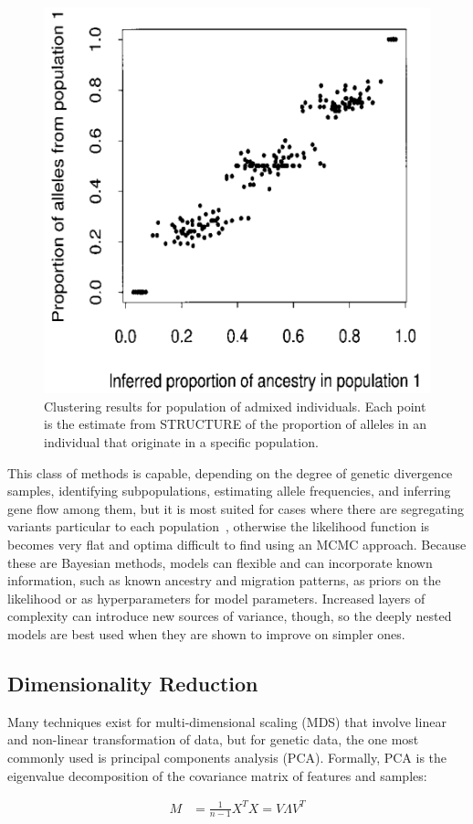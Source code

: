 \documentclass{essay}
\begin{document}
\begin{figure}
  \includegraphics[width=.5\linewidth,keepaspectratio]{../Figures/fig10.png}
  \caption{Clustering results for population of admixed individuals. Each point
  is the estimate from STRUCTURE of the proportion of alleles in an individual
  that originate in a specific population.~\cite{pritchard_inference_2000}}
\end{figure}

This class of methods is capable, depending on the degree of genetic divergence
samples, identifying subpopulations, estimating allele frequencies, and
inferring gene flow among them, but it is most suited for cases where there are
segregating variants particular to each
population~\cite{porras-hurtado_overview_2013}, otherwise the likelihood
function is becomes very flat and optima difficult to find using an MCMC
approach. Because these are Bayesian methods, models can flexible and can
incorporate known information, such as known ancestry and migration patterns,
as priors on the likelihood or as hyperparameters for model parameters.
Increased layers of complexity can introduce new sources of variance, though,
so the deeply nested models are best used when they are shown to improve on
simpler ones.

\subsection{Dimensionality Reduction}

Many techniques exist for multi-dimensional scaling (MDS) that involve linear
and non-linear transformation of data, but for genetic data, the one most
commonly used is principal components analysis (PCA).  Formally, PCA is the
eigenvalue decomposition of the covariance matrix of features and samples:

\begin{align}
  M &= \frac{1}{n-1} X^T X = V \Lambda V^T
\end{align}
\end{document}
